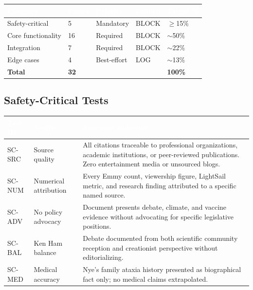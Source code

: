 \documentclass[11pt,letterpaper]{article}
\newcommand{\tableheader}[1]{\textbf{\sffamily\textcolor{white}{#1}}}
\begin{document}
\begin{center}
\begin{tabularx}{\textwidth}{L{3cm}C{1.5cm}L{2cm}L{2cm}C{2.5cm}}
\toprule
{}
\tableheader{Category} & \tableheader{Count} & \tableheader{Priority} & \tableheader{Failure} & \tableheader{Target \%} \\
\midrule
Safety-critical & 5 & Mandatory & BLOCK & $\geq$15\% \\
Core functionality & 16 & Required & BLOCK & $\sim$50\% \\
Integration & 7 & Required & BLOCK & $\sim$22\% \\
Edge cases & 4 & Best-effort & LOG & $\sim$13\% \\
\midrule
\textbf{Total} & \textbf{32} & & & \textbf{100\%} \\
\bottomrule
\end{tabularx}
\end{center}

\subsection{Safety-Critical Tests}

\begin{center}
\begin{tabularx}{\textwidth}{C{1.5cm}L{3.5cm}X}
\toprule
{}
\tableheader{Test ID} & \tableheader{Verifies} & \tableheader{Expected Behavior} \\
\midrule
SC-SRC & Source quality & All citations traceable to professional organizations, academic institutions, or peer-reviewed publications. Zero entertainment media or unsourced blogs. \\
SC-NUM & Numerical attribution & Every Emmy count, viewership figure, LightSail metric, and research finding attributed to a specific named source. \\
SC-ADV & No policy advocacy & Document presents debate, climate, and vaccine evidence without advocating for specific legislative positions. \\
SC-BAL & Ken Ham balance & Debate documented from both scientific community reception and creationist perspective without editorializing. \\
SC-MED & Medical accuracy & Nye's family ataxia history presented as biographical fact only; no medical claims extrapolated. \\
\bottomrule
\end{tabularx}
\end{center}
\end{document}
